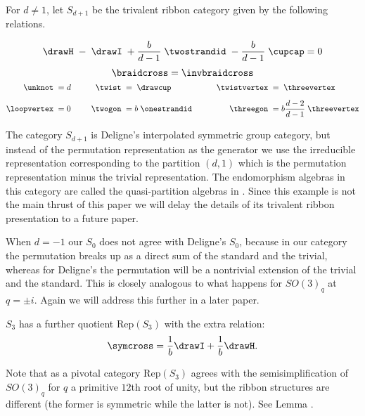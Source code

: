 \documentclass[12pt]{amsart}
\begin{document}
\begin{definition}
For $d \neq 1$, let  $S_{d+1}$ be the trivalent ribbon category given by the following relations.

$$  \drawH \; - \; \drawI \; + \frac{b}{d-1}\; \twostrandid \; -  \frac{b}{d-1}\; \cupcap = 0$$
$$\braidcross  =  \invbraidcross$$
\begin{align*}
    \unknot\; &= d &\qquad
      \twist\; &=  \;\drawcup&\qquad
        \twistvertex\; &=  \;\threevertex\\[5pt]
    \loopvertex\;&=0&
      \twogon\;&= b\;\onestrandid&
        \threegon\; &= b \frac{d-2}{d-1}\;\threevertex
\end{align*}
\end{definition}

The category $S_{d+1}$ is Deligne's interpolated symmetric group category, but instead of the permutation representation as the generator we use the irreducible representation corresponding to the partition $(d,1)$ which is the permutation representation minus the trivial representation.  The endomorphism algebras in this category are called the quasi-partition algebras in \cite{MR3177889}.  Since this example is not the main thrust of this paper we will delay the details of its trivalent ribbon presentation to a future paper.

\begin{warning}
When $d=-1$ our $S_0$ does not agree with Deligne's $S_0$, because in our category the permutation breaks up as a direct sum of the standard and the trivial, whereas for Deligne's the permutation will be a nontrivial extension of the trivial and the standard.  This is closely analogous to what happens for $SO(3)_q$ at $q=\pm i$.  Again we will address this further in a later paper.
\end{warning}

\begin{definition}
$S_{3}$ has a further quotient $\mathrm{Rep}(S_3)$ with the extra relation:
$$\symcross = \frac{1}{b}\drawI + \frac{1}{b}\drawH.$$
\end{definition}

Note that as a pivotal category $\mathrm{Rep}(S_3)$ agrees with the semisimplification of $SO(3)_q$ for $q$ a primitive $12$th root of unity, but the ribbon structures are different (the former is symmetric while the latter is not).  See Lemma .
\end{document}
